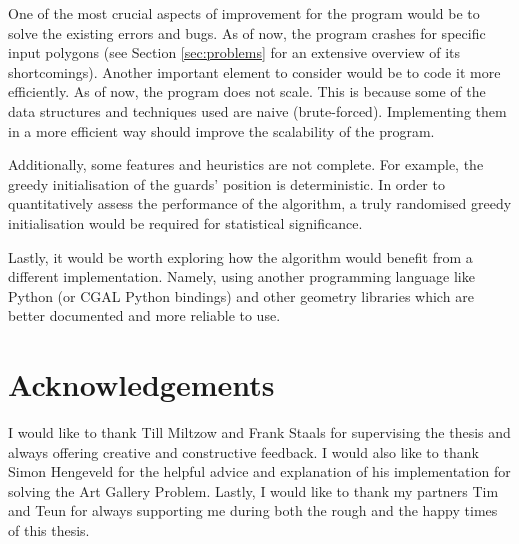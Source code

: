 One of the most crucial aspects of improvement for the program would be to solve the existing errors and bugs. As of now, the program crashes for specific input polygons (see Section \ref{sec:problems} for an extensive overview of its shortcomings). Another important element to consider would be to code it more efficiently. As of now, the program does not scale. This is because some of the data structures and techniques used are naive (brute-forced). Implementing them in a more efficient way should improve the scalability of the program.

Additionally, some features and heuristics are not complete. For example, the greedy initialisation of the guards' position is deterministic. In order to quantitatively assess the performance of the algorithm, a truly randomised greedy initialisation would be required for statistical significance.

Lastly, it would be worth exploring how the algorithm would benefit from a different implementation. Namely, using another programming language like Python (or CGAL Python bindings) and other geometry libraries which are better documented and more reliable to use.


\newpage
\thispagestyle{empty}
\section*{Acknowledgements}
I would like to thank Till Miltzow and Frank Staals for supervising the thesis and always offering creative and constructive feedback. I would also like to thank Simon Hengeveld for the helpful advice and explanation of his implementation for solving the Art Gallery Problem.
Lastly, I would like to thank my partners Tim and Teun for always supporting me during both the rough and the happy times of this thesis.